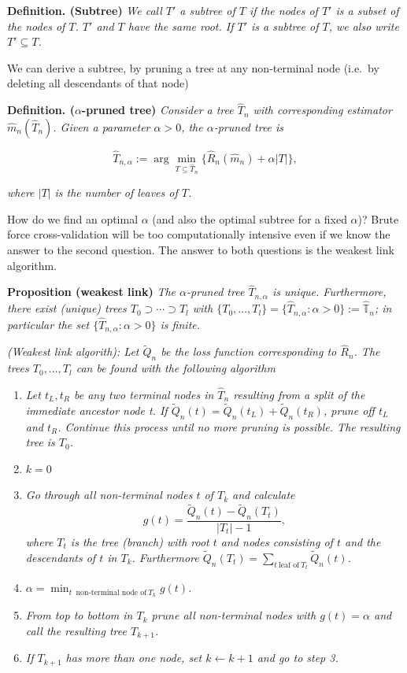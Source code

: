 \documentclass[a4paper,12pt,openany]{book}
\providecommand{\tightlist}{%
 \setlength{\itemsep}{0pt}\setlength{\parskip}{0pt}}
\begin{document}
\textbf{Definition. (Subtree)} \emph{We call \(T'\) a subtree of \(T\) if the nodes of \(T'\) is a subset of the nodes of \(T\). \(T'\) and \(T\) have the same root. If \(T'\) is a subtree of \(T\), we also write \(T'\subseteq T\).}

We can derive a subtree, by pruning a tree at any non-terminal node (i.e.~by deleting all descendants of that node)

\textbf{Definition. (\(\alpha\)-pruned tree)} \emph{Consider a tree \(\hat T_n\) with corresponding estimator \(\hat m_n(\hat T_n)\). Given a parameter \(\alpha>0\), the \(\alpha\)-pruned tree is}

\[
\hat T_{n,\alpha} := \arg \min_{T\subseteq \hat T_n}\{\hat R_n(\hat m_n) + \alpha |T|\},
\]

\emph{where \(|T|\) is the number of leaves of \(T\).}

How do we find an optimal \(\alpha\) (and also the optimal subtree for a fixed \(\alpha\))? Brute force cross-validation will be too computationally intensive even if we know the answer to the second question. The answer to both questions is the weakest link algorithm.

\textbf{Proposition (weakest link)} \emph{The \(\alpha\)-pruned tree \(\hat T_{n,\alpha}\) is unique. Furthermore, there exist (unique) trees \(T_0\supset \cdots\supset T_l\) with \(\{T_0,\dots, T_l\}=\{\hat T_{n,\alpha} : \alpha>0\}:=\hat{ \mathbb T}_n\); in particular the set \(\{\hat T_{n,\alpha} : \alpha>0\}\) is finite.}

\emph{(Weakest link algorith): Let \(\widetilde Q_n\) be the loss function corresponding to \(\hat R_n\). The trees \(T_0,\dots, T_l\) can be found with the following algorithm}

\begin{enumerate}
\def\labelenumi{\arabic{enumi})}
\tightlist
\item
  \emph{Let \(t_L,t_R\) be any two terminal nodes in \(\hat T_n\) resulting from a split of the immediate ancestor node t. If \(\widetilde Q_n(t) = \widetilde Q_n(t_L)+\widetilde Q_n(t_R)\), prune off \(t_L\) and \(t_R\). Continue this process until no more pruning is possible. The resulting tree is \(T_0\).}
\item
  \(k=0\)
\item
  \emph{Go through all non-terminal nodes \(t\) of \(T_k\) and calculate }
  \[g(t)=\frac{\widetilde Q_n(t)-\widetilde Q_n(T_t)}{|T_t|-1},\]
  \emph{where \(T_t\) is the tree (branch) with root \(t\) and nodes consisting of \(t\) and the descendants of \(t\) in \(T_k\). Furthermore \(\widetilde Q_n(T_t)=\sum_{t \ \text{leaf of}\  T_t} \widetilde Q_n(t)\).}
\item
  \(\alpha= \min_{t \ \text{ non-terminal node of} \ T_k}g(t)\).
\item
  \emph{From top to bottom in \(T_k\) prune all non-terminal nodes with \(g(t)=\alpha\) and call the resulting tree \(T_{k+1}\).}
\item
  \emph{If \(T_{k+1}\) has more than one node, set \(k \leftarrow k+1\) and go to step 3.}
\end{enumerate}
\end{document}
